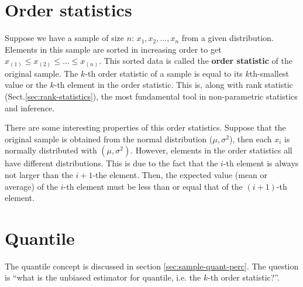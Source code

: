 \section{Order statistics}
\label{sec:order-statistics}


Suppose we have a sample of size $n$: $x_1,x_2,...,x_n$ from a given
distribution. Elements in this sample are sorted in increasing order to get
$x_{(1)} \le x_{(2)} \le ... \le x_{(n)}$. This sorted data is called the {\bf
order statistic} of the original sample.  The $k$-th order statistic of a sample
is equal to its $k$th-smallest value or the $k$-th element in the order
statistic. This is, along with rank statistic (Sect.\ref{sec:rank-statistics}),
the most fundamental tool in non-parametric statistics and inference.

There are some interesting properties of this order
statistics. Suppose that the original sample is obtained from the
normal distribution ($\mu,\sigma^2$), then each $x_i$ is normally distributed with
$(\mu,\sigma^2)$. However, elements in the order statistics all have
different distributions. This is due to the fact that the $i$-th element
is always not larger than the $i+1$-the element. Then, the expected
value (mean or average) of the $i$-th element must be less than or
equal that of the $(i+1)$-th element. 



\section{Quantile}
\label{sec:quantile}

The quantile concept is discussed in section
\ref{sec:sample-quant-perc}. The question is ``what is the unbiased
estimator for quantile, i.e. the $k$-th order statistic?''.

